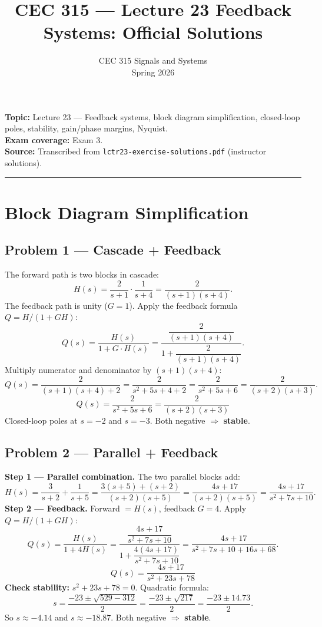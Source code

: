 \documentclass[11pt]{article}
\title{CEC 315 --- Lecture 23 Feedback Systems: Official Solutions}
\author{CEC 315 Signals and Systems \\ Spring 2026}
\date{}
\newcommand{\boxedeq}[1]{\boxed{\,#1\,}}
\begin{document}
\maketitle

\noindent\textbf{Topic:} Lecture 23 --- Feedback systems, block diagram simplification,
closed-loop poles, stability, gain/phase margins, Nyquist. \\
\textbf{Exam coverage:} Exam 3. \\
\textbf{Source:} Transcribed from \texttt{lctr23-exercise-solutions.pdf} (instructor solutions).

\bigskip\hrule\bigskip

\section*{Block Diagram Simplification}

\subsection*{Problem 1 --- Cascade + Feedback}

The forward path is two blocks in cascade:
\[
H(s) = \frac{2}{s+1}\cdot\frac{1}{s+4} = \frac{2}{(s+1)(s+4)}.
\]
The feedback path is unity ($G=1$). Apply the feedback formula $Q = H/(1+GH)$:
\[
Q(s) = \frac{H(s)}{1 + G\cdot H(s)} = \frac{\dfrac{2}{(s+1)(s+4)}}{1 + \dfrac{2}{(s+1)(s+4)}}.
\]
Multiply numerator and denominator by $(s+1)(s+4)$:
\[
Q(s) = \frac{2}{(s+1)(s+4)+2} = \frac{2}{s^2+5s+4+2} = \frac{2}{s^2+5s+6} = \frac{2}{(s+2)(s+3)}.
\]
\[
\boxedeq{Q(s) = \frac{2}{s^2+5s+6} = \frac{2}{(s+2)(s+3)}}
\]
Closed-loop poles at $s=-2$ and $s=-3$. Both negative $\Longrightarrow$ \textbf{stable}.

\subsection*{Problem 2 --- Parallel + Feedback}

\textbf{Step 1 --- Parallel combination.} The two parallel blocks add:
\[
H(s) = \frac{3}{s+2} + \frac{1}{s+5}
     = \frac{3(s+5)+(s+2)}{(s+2)(s+5)}
     = \frac{4s+17}{(s+2)(s+5)}
     = \frac{4s+17}{s^2+7s+10}.
\]
\textbf{Step 2 --- Feedback.} Forward $=H(s)$, feedback $G=4$. Apply $Q = H/(1+GH)$:
\[
Q(s) = \frac{H(s)}{1+4H(s)}
     = \frac{\dfrac{4s+17}{s^2+7s+10}}{1+\dfrac{4(4s+17)}{s^2+7s+10}}
     = \frac{4s+17}{s^2+7s+10+16s+68}.
\]
\[
\boxedeq{Q(s) = \frac{4s+17}{s^2+23s+78}}
\]
\textbf{Check stability:} $s^2+23s+78=0$. Quadratic formula:
\[
s = \frac{-23\pm\sqrt{529-312}}{2} = \frac{-23\pm\sqrt{217}}{2} = \frac{-23\pm 14.73}{2}.
\]
So $s\approx -4.14$ and $s\approx -18.87$. Both negative $\Longrightarrow$ \textbf{stable}.
\end{document}
